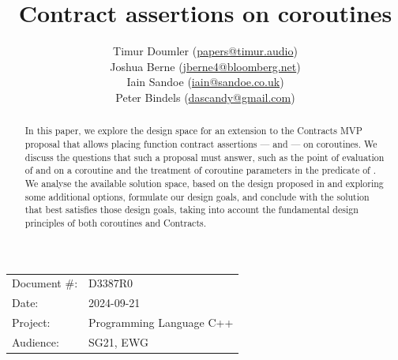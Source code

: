 

 \usepackage[bottom]{footmisc} 

 \usepackage{longtable}


\usepackage{tikz,lipsum,lmodern}
\usepackage[most]{tcolorbox}



\usepackage{titlesec}
\usepackage{tocloft}


\newcommand{\changelocaltocdepth}[1]{%
  \addtocontents{toc}{\protect\setcounter{tocdepth}{#1}}%
  \setcounter{tocdepth}{#1}%
}

\setcounter{tocdepth}{3}



\title{Contract assertions on coroutines}
\author{
Timur Doumler \small(\href{mailto:papers@timur.audio}{papers@timur.audio}) \\
Joshua Berne \small(\href{mailto:jberne4@bloomberg.net}{jberne4@bloomberg.net}) \\
Iain Sandoe \small(\href{mailto:iain@sandoe.co.uk}{iain@sandoe.co.uk}) \\
Peter Bindels \small(\href{mailto:dascandy@gmail.com}{dascandy@gmail.com}) 
}
\date{}
\maketitle

\begin{tabular}{ll}
Document \#: & D3387R0 \\
Date: &2024-09-21 \\
Project: & Programming Language C++ \\
Audience: & SG21, EWG
\end{tabular}

\begin{abstract}
In this paper, we explore the design space for an extension to the Contracts MVP proposal \cite{P2900R8} that allows placing function contract assertions ---  and 
 --- on coroutines. We discuss the questions that such a proposal must answer, such as the point of evaluation of  and  on a coroutine and the treatment of coroutine parameters in the predicate of . We analyse the available solution space, based on the design proposed in \cite{P2957R1} and exploring some additional options, formulate our design goals, and conclude with the solution that best satisfies those design goals, taking into account the fundamental design principles of both coroutines and Contracts.
\end{abstract}

